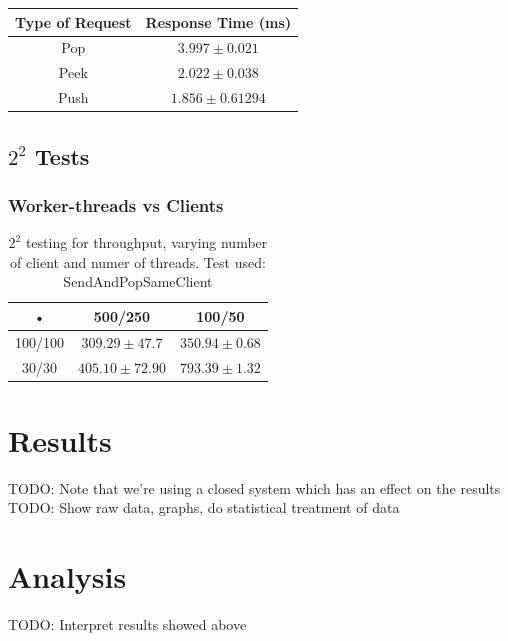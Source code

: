 \documentclass{article}
\begin{document}
            
            
            \begin{tabular}{|c|c|}
                \hline 
            \textbf{Type of Request} & \textbf{Response Time} (ms) \\ 
            \hline 
            Pop & $3.997 \pm 0.021$ \\ 
            \hline 
            Peek & $2.022 \pm 0.038$ \\ 
            \hline 
            Push & $1.856 \pm 0.61294$ \\ 
            \hline 
            \end{tabular} 
		\subsection{$2^2$ Tests}
		\subsubsection{Worker-threads vs Clients}
		\begin{table}
			\begin{tabular}{|c|c|c|}
			\hline 
			• & 500/250 & 100/50 \\ 
			\hline 
			100/100 & $309.29 \pm 47.7$ & $350.94 \pm 0.68$ \\ 
			\hline 
			30/30 & $405.10 \pm 72.90$ & $793.39 \pm 1.32$ \\ 
			\hline 
			\end{tabular} 
            \caption{$2^2$ testing for throughput, varying number of client and numer of threads. Test used: SendAndPopSameClient}
            \label{table:2k2-threads-clients}
            \end{table}

    \section{Results}
        TODO: Note that we're using a closed system which has an effect on the results\\
        TODO: Show raw data, graphs, do statistical treatment of data
            
    \section{Analysis}
        TODO: Interpret results showed above
\end{document}
